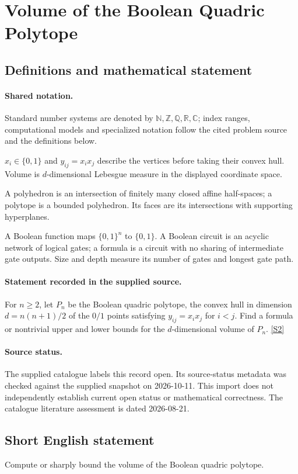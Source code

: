 \documentclass[11pt]{article}
\newcommand{\sref}[2]{\hyperlink{source:#1:#2}{[S#2]}}
\begin{document}
\section{Volume of the Boolean Quadric Polytope}\label{statement}

\subsection{Definitions and mathematical statement}

\paragraph{Shared notation.}Standard number systems are denoted by $\mathbb N,\mathbb Z,\mathbb Q,\mathbb R,\mathbb C$; index ranges, computational models and specialized notation follow the cited problem source and the definitions below.


$x_i\in\{0,1\}$ and $y_{ij}=x_ix_j$ describe the vertices before taking their convex hull. Volume is $d$-dimensional Lebesgue measure in the displayed coordinate space.

A polyhedron is an intersection of finitely many closed affine half-spaces; a polytope is a bounded polyhedron. Its faces are its intersections with supporting hyperplanes.

A Boolean function maps $\{0,1\}^n$ to $\{0,1\}$. A Boolean circuit is an acyclic network of logical gates; a formula is a circuit with no sharing of intermediate gate outputs. Size and depth measure its number of gates and longest gate path.
\paragraph{Statement recorded in the supplied source.}
For $n\geq2$, let $P_n$ be the Boolean quadric polytope, the convex hull in dimension $d=n(n+1)/2$ of the $0/1$ points satisfying $y_{ij}=x_ix_j$ for $i<j$. Find a formula or nontrivial upper and lower bounds for the $d$-dimensional volume of $P_n$. \sref{statement}{2}
\paragraph{Source status.}
The supplied catalogue labels this record open. Its source-status metadata was checked against the supplied snapshot on 2026-10-11. This import does not independently establish current open status or mathematical correctness. The catalogue literature assessment is dated 2026-08-21.
\subsection{Short English statement}
Compute or sharply bound the volume of the Boolean quadric polytope.
\end{document}
